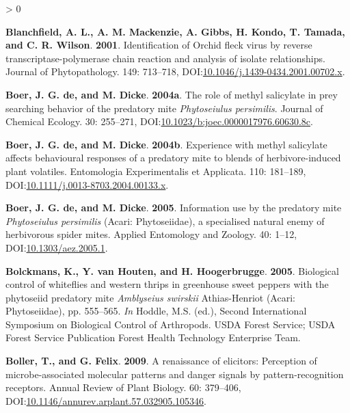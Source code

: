 \documentclass{ufdissertation}[overrideChapters] %
\newlength{\cslhangindent}
\newenvironment{CSLReferences}[2] %
 {%
  \setlength{\parindent}{0pt}
  \ifodd #1 \everypar{\setlength{\hangindent}{\cslhangindent}}\ignorespaces\fi
  \ifnum #2 > 0
  \setlength{\parskip}{#2\baselineskip}
  \fi
 }%
 {}
\begin{document}
{\begin{CSLReferences}{1}{1}
\leavevmode{}%
\textbf{Blanchfield, A. L., A. M. Mackenzie, A. Gibbs, H. Kondo, T. Tamada, and C. R. Wilson}. \textbf{2001}. Identification of {Orchid fleck virus} by reverse transcriptase-polymerase chain reaction and analysis of isolate relationships. Journal of Phytopathology. 149: 713--718, DOI:\href{https://doi.org/10.1046/j.1439-0434.2001.00702.x}{10.1046/j.1439-0434.2001.00702.x}.

\leavevmode{}%
\textbf{Boer, J. G. de, and M. Dicke}. \textbf{2004a}. The role of methyl salicylate in prey searching behavior of the predatory mite {\emph{Phytoseiulus persimilis}}. Journal of Chemical Ecology. 30: 255--271, DOI:\href{https://doi.org/10.1023/b:joec.0000017976.60630.8c}{10.1023/b:joec.0000017976.60630.8c}.

\leavevmode{}%
\textbf{Boer, J. G. de, and M. Dicke}. \textbf{2004b}. Experience with methyl salicylate affects behavioural responses of a predatory mite to blends of herbivore-induced plant volatiles. Entomologia Experimentalis et Applicata. 110: 181--189, DOI:\href{https://doi.org/10.1111/j.0013-8703.2004.00133.x}{10.1111/j.0013-8703.2004.00133.x}.

\leavevmode{}%
\textbf{Boer, J. G. de, and M. Dicke}. \textbf{2005}. Information use by the predatory mite {\emph{Phytoseiulus persimilis}} {({Acari}: {Phytoseiidae})}, a specialised natural enemy of herbivorous spider mites. Applied Entomology and Zoology. 40: 1--12, DOI:\href{https://doi.org/10.1303/aez.2005.1}{10.1303/aez.2005.1}.

\leavevmode{}%
\textbf{Bolckmans, K., Y. van Houten, and H. Hoogerbrugge}. \textbf{2005}. Biological control of whiteflies and western thrips in greenhouse sweet peppers with the phytoseiid predatory mite {\emph{Amblyseius swirskii}} {Athias-Henriot} ({Acari}: {Phytoseiidae}), pp. 555--565. \emph{In} Hoddle, M.S. (ed.), Second International Symposium on Biological Control of Arthropods. USDA Forest Service; USDA Forest Service Publication Forest Health Technology Enterprise Team.

\leavevmode{}%
\textbf{Boller, T., and G. Felix}. \textbf{2009}. A renaissance of elicitors: Perception of microbe-associated molecular patterns and danger signals by pattern-recognition receptors. Annual Review of Plant Biology. 60: 379--406, DOI:\href{https://doi.org/10.1146/annurev.arplant.57.032905.105346}{10.1146/annurev.arplant.57.032905.105346}.


\end{CSLReferences}}
\end{document}
